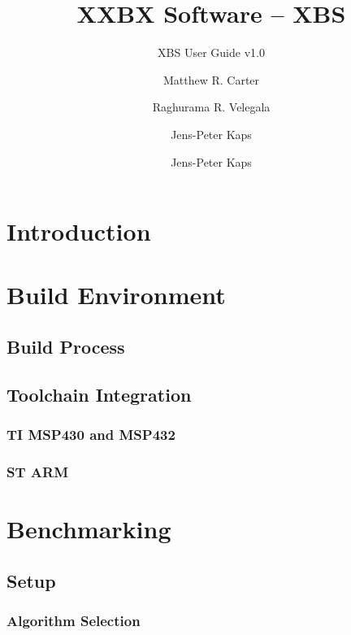 \documentclass[twoside,11pt]{cergdoc}
\begin{document}
\title{XXBX Software -- XBS}
\subtitle{XBS User Guide v1.0}
\author{Matthew R. Carter \and Raghurama R. Velegala \and Jens-Peter Kaps}
\author{Jens-Peter Kaps}

\maketitle

\tableofcontents

\chapter{Introduction}
\chapter{Build Environment}
  \section{Build Process}
  \section{Toolchain Integration}
    \subsection{TI MSP430 and MSP432}
    \subsection{ST ARM}
\chapter{Benchmarking}
  \section{Setup}
    \subsection{Algorithm Selection}
\end{document}
